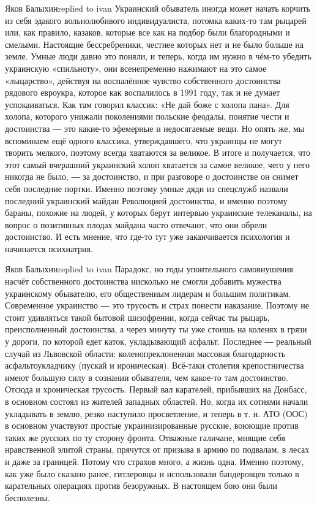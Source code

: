 Яков Балыхинreplied to ivan
Украинский обыватель иногда может начать корчить из себя эдакого вольнолюбивого индивидуалиста, потомка каких-то там рыцарей или, как правило, казаков, которые все как на подбор были благородными и смелыми. Настоящие бессребреники, честнее которых нет и не было больше на земле. Умные люди давно это поняли, и теперь, когда им нужно в чём-то убедить украинскую «спильноту», они всенепременно нажимают на это самое «лыцарство», действуя на воспалённое чувство собственного достоинства рядового евроукра, которое как воспалилось в 1991 году, так и не думает успокаиваться. Как там говорил классик: «Не дай боже с холопа пана». Для холопа, которого унижали поколениями польские феодалы, понятие чести и достоинства ― это какие-то эфемерные и недосягаемые вещи. Но опять же, мы вспоминаем ещё одного классика, утверждавшего, что украинцы не могут творить мелкого, поэтому всегда хватаются за великое. В итоге и получается, что этот самый вчерашний украинский холоп хватается за самое великое, чего у него никогда не было, ― за достоинство, и при разговоре о достоинстве он снимет себя последние портки. Именно поэтому умные дяди из спецслужб назвали последний украинский майдан Революцией достоинства, и именно поэтому бараны, похожие на людей, у которых берут интервью украинские телеканалы, на вопрос о позитивных плодах майдана часто отвечают, что они обрели достоинство. И есть мнение, что где-то тут уже заканчивается психология и начинается психиатрия.

Яков Балыхинreplied to ivan
Парадокс, но годы упоительного самовнушения насчёт собственного достоинства нисколько не смогли добавить мужества украинскому обывателю, его общественным лидерам и большим политикам. Современное украинство ― это трусость и страх понести наказание. Поэтому не стоит удивляться такой бытовой шизофрении, когда сейчас ты рыцарь, преисполненный достоинства, а через минуту ты уже стоишь на коленях в грязи у дороги, по которой едет каток, укладывающий асфальт. Последнее ― реальный случай из Львовской области: коленопреклоненная массовая благодарность асфальтоукладчику (пускай и ироническая). Всё-таки столетия крепостничества имеют большую силу в сознании обывателя, чем какое-то там достоинство. Отсюда и хроническая трусость. Первый вал карателей, прибывших на Донбасс, в основном состоял из жителей западных областей. Но, когда их сотнями начали укладывать в землю, резко наступило просветление, и теперь в т. н. АТО (ООС) в основном участвуют простые украинизированные русские, воюющие против таких же русских по ту сторону фронта. Отважные галичане, мнящие себя нравственной элитой страны, прячутся от призыва в армию по подвалам, в лесах и даже за границей. Потому что страхов много, а жизнь одна. Именно поэтому, как уже было сказано ранее, гитлеровцы и использовали бандеровцев только в карательных операциях против безоружных. В настоящем бою они были бесполезны.

